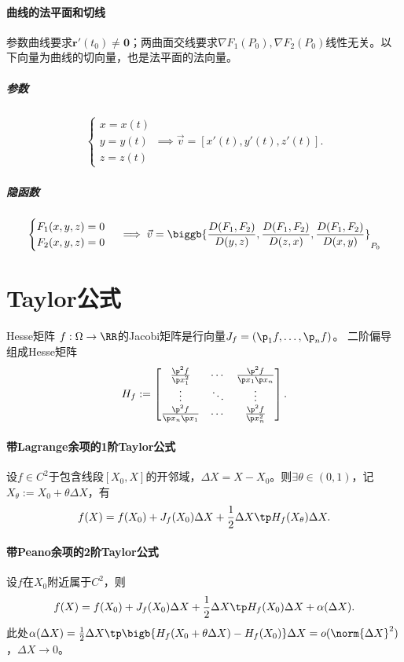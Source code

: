 \paragraph{曲线的法平面和切线}
参数曲线要求$\bm r'(t_0)\neq\bm0$；两曲面交线要求$\nabla F_1(P_0),\nabla F_2(P_0)$线性无关。以下向量为曲线的切向量，也是法平面的法向量。
\subparagraph{参数}
\begin{align*}
	\begin{cases}
		x=x(t) \\[-1ex]
		y=y(t) \\[-1ex]
		z=z(t)
	\end{cases}
	\implies\vec v=[x'(t),y'(t),z'(t)].
\end{align*}
\subparagraph{隐函数}
\begin{align*}
	\begin{cases}
		F_1(x,y,z)=0 \\
		F_2(x,y,z)=0
	\end{cases}
	\implies\vec v=\biggb{\frac{D(F_1,F_2)}{D(y,z)},\frac{D(F_1,F_2)}{D(z,x)},\frac{D(F_1,F_2)}{D(x,y)}}_{P_0}
\end{align*}
\section{Taylor公式}
\begin{definition}{Hesse矩阵}{}
	$f:\Omega\to\RR$的Jacobi矩阵是行向量$J_f=(\p_1f,\ldots,\p_nf)$。
	二阶偏导组成Hesse矩阵
	\begin{align*}
		H_f:=
		\begin{bmatrix}
			\frac{\p^2f}{\p x_1^2}     & \cdots & \frac{\p^2f}{\p x_1\p x_n} \\
			\vdots                     & \ddots & \vdots                     \\
			\frac{\p^2f}{\p x_n\p x_1} & \cdots & \frac{\p^2f}{\p x_n^2}
		\end{bmatrix}.
	\end{align*}
\end{definition}
\paragraph{带Lagrange余项的1阶Taylor公式}
设$f\in C^2$于包含线段$[X_0,X]$的开邻域，$\Delta X=X-X_0$。则$\exists\theta\in(0,1)$，记$X_\theta:=X_0+\theta\Delta X$，有
\begin{align}
	f(X)=f(X_0)+J_f(X_0)\Delta X+\frac12\Delta X\tp H_f(X_\theta)\Delta X.
\end{align}
\paragraph{带Peano余项的2阶Taylor公式}
设$f$在$X_0$附近属于$C^2$，则
\begin{align}
	f(X)=f(X_0)+J_f(X_0)\Delta X+\frac12\Delta X\tp H_f(X_0)\Delta X+\alpha(\Delta X).
\end{align}
此处$\alpha(\Delta X)=\frac12\Delta X\tp\bigb{H_f(X_0+\theta\Delta X)-H_f(X_0)}\Delta X=o(\norm{\Delta X}^2)$，$\Delta X\to0$。
